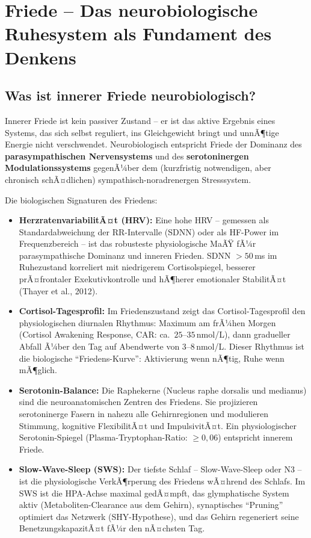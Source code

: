 ﻿\documentclass[12pt,a4paper]{report}
\theoremstyle{plain}
\theoremstyle{definition}
\theoremstyle{remark}
\begin{document}
	\section{Friede -- Das neurobiologische Ruhesystem als Fundament des Denkens}

	\subsection{Was ist innerer Friede neurobiologisch?}

	Innerer Friede ist kein passiver Zustand -- er ist das aktive Ergebnis
	eines Systems, das sich selbst reguliert, ins Gleichgewicht bringt
	und unnÃ¶tige Energie nicht verschwendet.
	Neurobiologisch entspricht Friede der Dominanz des
	\textbf{parasympathischen Nervensystems} und des
	\textbf{serotoninergen Modulationssystems} gegenÃ¼ber dem
	(kurzfristig notwendigen, aber chronisch schÃ¤dlichen)
	sympathisch-noradrenergen Stresssystem.

	Die biologischen Signaturen des Friedens:
	\begin{itemize}
		\item \textbf{HerzratenvariabilitÃ¤t (HRV):}
		Eine hohe HRV -- gemessen als Standardabweichung der
		RR-Intervalle (SDNN) oder als HF-Power im Frequenzbereich --
		ist das robusteste physiologische MaÃŸ fÃ¼r parasympathische
		Dominanz und inneren Frieden. SDNN $> 50$\,ms im Ruhezustand
		korreliert mit niedrigerem Cortisolspiegel, besserer
		prÃ¤frontaler Exekutivkontrolle und hÃ¶herer emotionaler
		StabilitÃ¤t (Thayer et al., 2012).
		\item \textbf{Cortisol-Tagesprofil:}
		Im Friedenszustand zeigt das Cortisol-Tagesprofil den
		physiologischen diurnalen Rhythmus: Maximum am frÃ¼hen Morgen
		(Cortisol Awakening Response, CAR: ca.\ $25$--$35$\,nmol/L),
		dann gradueller Abfall Ã¼ber den Tag auf Abendwerte von
		$3$--$8$\,nmol/L. Dieser Rhythmus ist die biologische
		``Friedens-Kurve'': Aktivierung wenn nÃ¶tig, Ruhe wenn mÃ¶glich.
		\item \textbf{Serotonin-Balance:}
		Die Raphekerne (Nucleus raphe dorsalis und medianus) sind
		die neuroanatomischen Zentren des Friedens.
		Sie projizieren serotoninerge Fasern in nahezu alle
		Gehirnregionen und modulieren Stimmung, kognitive FlexibilitÃ¤t
		und ImpulsivitÃ¤t. Ein physiologischer Serotonin-Spiegel
		(Plasma-Tryptophan-Ratio: $\geq 0{,}06$) entspricht innerem Friede.
		\item \textbf{Slow-Wave-Sleep (SWS):}
		Der tiefste Schlaf -- Slow-Wave-Sleep oder N3 -- ist die
		physiologische VerkÃ¶rperung des Friedens wÃ¤hrend des Schlafs.
		Im SWS ist die HPA-Achse maximal gedÃ¤mpft, das glymphatische
		System aktiv (Metaboliten-Clearance aus dem Gehirn),
		synaptisches ``Pruning'' optimiert das Netzwerk (SHY-Hypothese),
		und das Gehirn regeneriert seine BenetzungskapazitÃ¤t fÃ¼r den
		nÃ¤chsten Tag.
	\end{itemize}
\end{document}
